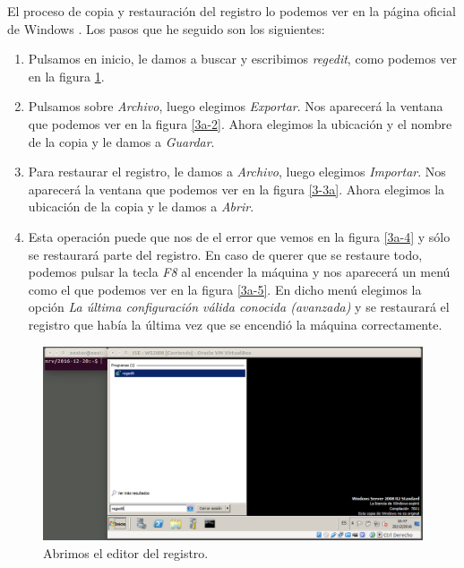 \documentclass[a4paper,titlepage,12pt]{scrartcl}	%
\numberwithin{figure}{section} %
\numberwithin{table}{section} %
\begin{document}
	El proceso de copia y restauración del registro lo podemos ver en la página oficial de Windows \cite{registro_windows}. Los pasos que he seguido son los siguientes:
	\begin{enumerate}
		\item Pulsamos en inicio, le damos a buscar y escribimos \textit{regedit}, como podemos ver en la figura \ref{3a-1}.
		\item Pulsamos sobre \textit{Archivo}, luego elegimos \textit{Exportar}. Nos aparecerá la ventana que podemos ver en la figura \ref{3a-2}. Ahora elegimos la ubicación y el nombre de la copia y le damos a \textit{Guardar}.
		\item Para restaurar el registro, le damos a \textit{Archivo}, luego elegimos \textit{Importar}. Nos aparecerá la ventana que podemos ver en la figura \ref{3-3a}. Ahora elegimos la ubicación de la copia y le damos a \textit{Abrir}.
		\item Esta operación puede que nos de el error que vemos en la figura \ref{3a-4} y sólo se restaurará parte del registro. En caso de querer que se restaure todo, podemos pulsar la tecla \textit{F8} al encender la máquina y nos aparecerá un menú como el que podemos ver en la figura \ref{3a-5}. En dicho menú elegimos la opción \textit{La última configuración válida conocida (avanzada)} y se restaurará el registro que había la última vez que se encendió la máquina correctamente.
	\end{enumerate}
	
	\begin{figure}[H]
		\includegraphics[width=\linewidth]{./Imagenes/3a-1.png}
		\vspace{-0.5cm}
		\caption[Abrimos el editor del registro.]{Abrimos el editor del registro.}
		\label{3a-1}
	\end{figure}
	
\end{document}
